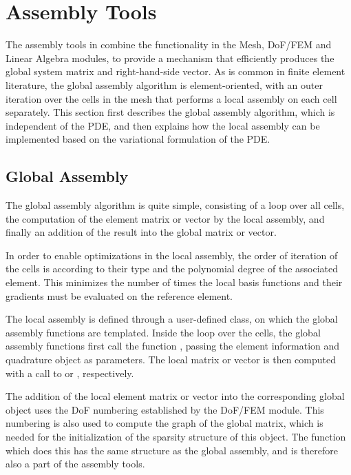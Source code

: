\section{Assembly Tools}
\label{sec:assembly}
The assembly tools in \hiflow{} combine the functionality in the Mesh,
DoF/FEM and Linear Algebra modules, to provide a mechanism that
efficiently produces the global system matrix and right-hand-side
vector. As is common in finite element literature, the global assembly
algorithm is element-oriented, with an outer iteration over the cells
in the mesh that performs a local assembly on each cell
separately. This section first describes the global assembly
algorithm, which is independent of the PDE, and then
explains how the local assembly can be implemented based on the
variational formulation of the PDE.

\subsection{Global Assembly}
The global assembly algorithm is quite simple, consisting of a loop
over all cells, the computation of the element matrix or vector by the
local assembly, and finally an addition of the result into the global
matrix or vector.

In order to enable optimizations in the local
assembly, the order of iteration of the cells is according to their
type and the polynomial degree of the associated element. This
minimizes the number of times the local basis functions and their
gradients must be evaluated on the reference element.

The local assembly is defined through a user-defined class, on which
the global assembly functions are templated. Inside the loop over the
cells, the global assembly functions first call the function
, passing the element information and
quadrature object as parameters. The local matrix or vector is then
computed with a call to  or
, respectively.

The addition of the local element matrix or vector into the
corresponding global object uses the DoF numbering established by the
DoF/FEM module. This numbering is also used to compute the graph of
the global matrix, which is needed for the initialization of the
sparsity structure of this object. The function which does this has
the same structure as the global assembly, and is therefore also a
part of the assembly tools.

